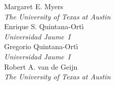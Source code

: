 \noindent
Margaret E. Myers\\
{\em The University of Texas at Austin}\\

\noindent
Enrique S. Quintana-Ort\'{\i} \\
{\em Universidad Jaume~I} \\

\noindent
Gregorio Quintana-Ort\'{\i} \\
{\em Universidad Jaume~I} \\

\noindent
Robert A. van de Geijn\\
{\em The University of Texas at Austin}\\





%

\mainmatter

\pagestyle{fancy}
\fancyhf{}
\renewcommand\chaptermark[1]{\markboth{\thechapter. #1}{}}
\renewcommand\sectionmark[1]{\markright{\thesection. #1}{}}
\renewcommand\headrulewidth{0.2pt}
\fancyhead[LO]{{\bf \sffamily \rightmark}}
\fancyhead[RO]{{\bf \sffamily \thepage}}
\fancyhead[LE]{{\bf \sffamily \thepage}}
\fancyhead[RE]{{\bf \sffamily \leftmark}}
